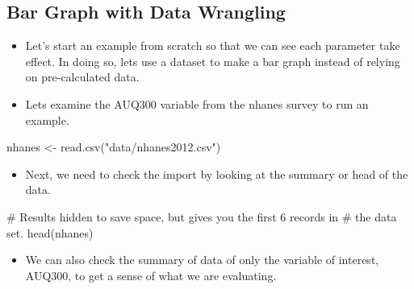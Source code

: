 \documentclass[
  letterpaper,
  DIV=11,
  numbers=noendperiod]{scrreprt}
\newenvironment{Shaded}{\begin{snugshade}}{\end{snugshade}}
\newcommand{\CommentTok}[1]{\textcolor[rgb]{0.37,0.37,0.37}{#1}}
\newcommand{\FunctionTok}[1]{\textcolor[rgb]{0.28,0.35,0.67}{#1}}
\newcommand{\NormalTok}[1]{\textcolor[rgb]{0.00,0.23,0.31}{#1}}
\newcommand{\OtherTok}[1]{\textcolor[rgb]{0.00,0.23,0.31}{#1}}
\newcommand{\SpecialCharTok}[1]{\textcolor[rgb]{0.37,0.37,0.37}{#1}}
\newcommand{\StringTok}[1]{\textcolor[rgb]{0.13,0.47,0.30}{#1}}
\providecommand{\tightlist}{%
  \setlength{\itemsep}{0pt}\setlength{\parskip}{0pt}}\usepackage{longtable,booktabs,array}
\begin{document}
\subsection{Bar Graph with Data
Wrangling}\label{bar-graph-with-data-wrangling}

\begin{itemize}
\tightlist
\item
  Let's start an example from scratch so that we can see each parameter
  take effect. In doing so, lets use a dataset to make a bar graph
  instead of relying on pre-calculated data.\\
\item
  Lets examine the AUQ300 variable from the nhanes survey to run an
  example.
\end{itemize}

\begin{Shaded}
\begin{Highlighting}[]
\NormalTok{nhanes }\OtherTok{\textless{}{-}} \FunctionTok{read.csv}\NormalTok{(}\StringTok{"data/nhanes2012.csv"}\NormalTok{)}
\end{Highlighting}
\end{Shaded}

\begin{itemize}
\tightlist
\item
  Next, we need to check the import by looking at the summary or head of
  the data.
\end{itemize}

\begin{Shaded}
\begin{Highlighting}[]
\CommentTok{\# Results hidden to save space, but gives you the first 6 records in}
\CommentTok{\# the data set.}
\FunctionTok{head}\NormalTok{(nhanes)}
\end{Highlighting}
\end{Shaded}

\begin{itemize}
\tightlist
\item
  We can also check the summary of data of only the variable of
  interest, AUQ300, to get a sense of what we are evaluating.
\end{itemize}

\begin{Shaded}
\end{Shaded}
\end{document}
